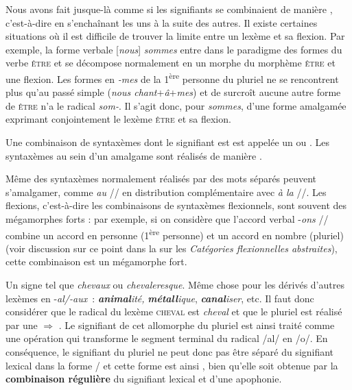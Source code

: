 Nous avons fait jusque-là comme si les signifiants se combinaient de manière , c’est-à-dire en s’enchaînant les uns à la suite des autres. Il existe certaines situations où il est difficile de trouver la limite entre un lexème et sa flexion. Par exemple, la forme verbale [\textit{nous}] \textit{sommes} entre dans le paradigme des formes du verbe \textsc{être} et se décompose normalement en un morphe du morphème \textsc{être} et une flexion. Les formes en \textit{{}-mes} de la 1\textsuperscript{ère} personne du pluriel ne se rencontrent plus qu’au passé simple (\textit{nous chant}+\textit{â}+\textit{mes}) et de surcroît aucune autre forme de \textsc{être} n’a le radical \textit{som-}. Il s’agit donc, pour \textit{sommes}, d’une forme amalgamée exprimant conjointement le lexème \textsc{être} et sa flexion.

\begin{styleLivreImportant}
Une combinaison de syntaxèmes dont le signifiant est  est appelée un  ou . Les syntaxèmes au sein d’un amalgame sont réalisés de manière .
\end{styleLivreImportant}

Même des syntaxèmes normalement réalisés par des mots séparés peuvent s’amalgamer, comme \textit{au} // en distribution complémentaire avec \textit{à la} //. Les flexions, c’est-à-dire les combinaisons de syntaxèmes flexionnels, sont souvent des mégamorphes forts : par exemple, si on considère que l’accord verbal -\textit{ons} // combine un accord en personne (1\textsuperscript{ère} personne) et un accord en nombre (pluriel) (voir discussion sur ce point dans la  sur les \textit{Catégories flexionnelles abstraites}), cette combinaison est un mégamorphe fort.

Un signe tel que \textit{chevaux}  ou \textit{chevaleresque}. Même chose pour les dérivés d’autres lexèmes en -\textit{al/-aux~}: \textbf{\textit{animal}}\textit{ité,} \textbf{\textit{métall}}\textit{ique}, \textbf{\textit{canal}}\textit{iser}, etc. Il faut donc considérer que le radical du lexème \textsc{cheval} est \textit{cheval} et que le pluriel est réalisé par une   ${\Rightarrow}$ . Le signifiant de cet allomorphe du pluriel est ainsi traité comme une opération qui transforme le segment terminal du radical /al/ en /o/. En conséquence, le signifiant du pluriel ne peut donc pas être séparé du signifiant lexical dans la forme / et cette forme est ainsi , bien qu’elle soit obtenue par la \textbf{combinaison régulière} du signifiant lexical et d’une apophonie.

